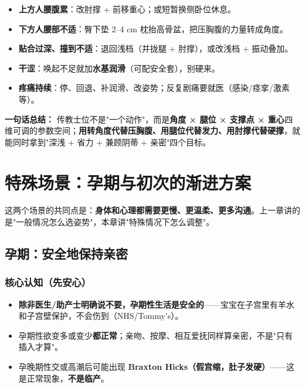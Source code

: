\documentclass[12pt,UTF8,openany]{ctexbook}
\begin{document}
\begin{itemize}[leftmargin=2em,itemsep=0.3em]
  \item \textbf{上方人腰腹累}：改肘撑 + 前移重心；或短暂换侧卧位休息。
  \item \textbf{下方人腰部不适}：臀下垫 2–4 cm 枕抬高骨盆，把压胸腹的力量转成角度。
  \item \textbf{贴合过深、撞到不适}：退回浅档（并拢腿 + 肘撑），或改浅档 + 振动叠加。
  \item \textbf{干涩}：唤起不足就加\textbf{水基润滑}（可配安全套），别硬来。
  \item \textbf{疼痛持续}：停、回退、补润滑、改姿势；反复剧痛要就医（感染/痉挛/激素等）。
\end{itemize}

\vspace{1em}
\noindent\textbf{一句话总结：} 传教士位不是"一个动作"，而是\textbf{角度 × 腿位 × 支撑点 × 重心}四维可调的参数空间；\textbf{用转角度代替压胸腹、用腿位代替发力、用肘撑代替硬撑}，就能同时拿到"深浅 + 省力 + 兼顾阴蒂 + 亲密"四个目标。

\chapter{特殊场景：孕期与初次的渐进方案}

这两个场景的共同点是：\textbf{身体和心理都需要更慢、更温柔、更多沟通}。上一章讲的是"一般情况怎么选姿势"，本章讲"特殊情况下怎么调整"。

\section{孕期：安全地保持亲密}

\subsection{核心认知（先安心）}

\begin{itemize}[leftmargin=2em,itemsep=0.3em]
  \item \textbf{除非医生/助产士明确说不要，孕期性生活是安全的}——宝宝在子宫里有羊水和子宫壁保护，不会伤到（NHS/Tommy's）。
  \item 孕期性欲变多或变少\textbf{都正常}；亲吻、按摩、相互爱抚同样算亲密，不是"只有插入才算"。
  \item 孕晚期性交或高潮后可能出现 \textbf{Braxton Hicks（假宫缩，肚子发硬）}——这是正常现象，\textbf{不是临产}。
\end{itemize}
\end{document}
